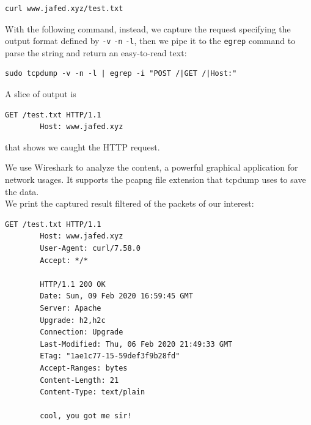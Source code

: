 \documentclass[12pt]{article}
\begin{document}
	\begin{lstlisting}[frame=single]
		curl www.jafed.xyz/test.txt
	\end{lstlisting}
	
	With the following command, instead, we capture the request specifying the output format defined by \lstinline{-v} \lstinline{-n} \lstinline{-l}, then we pipe it to the \lstinline{egrep} command to parse the string and return an easy-to-read text:\\
	
	\begin{lstlisting}[frame=single]
		sudo tcpdump -v -n -l | egrep -i "POST /|GET /|Host:"
	\end{lstlisting}

	A slice of output is\\
	
	\begin{lstlisting}[frame=single]
		GET /test.txt HTTP/1.1
        Host: www.jafed.xyz
	\end{lstlisting}

	that shows we caught the HTTP request.
	
	We use Wireshark to analyze the content, a powerful graphical application for network usages. It supports the pcapng file extension that tcpdump uses to save the data.\\
	We print the captured result filtered of the packets of our interest:\\
	
	\begin{lstlisting}[frame=single]
		GET /test.txt HTTP/1.1
		Host: www.jafed.xyz
		User-Agent: curl/7.58.0
		Accept: */*

		HTTP/1.1 200 OK
		Date: Sun, 09 Feb 2020 16:59:45 GMT
		Server: Apache
		Upgrade: h2,h2c
		Connection: Upgrade
		Last-Modified: Thu, 06 Feb 2020 21:49:33 GMT
		ETag: "1ae1c77-15-59def3f9b28fd"
		Accept-Ranges: bytes
		Content-Length: 21
		Content-Type: text/plain

		cool, you got me sir!
	\end{lstlisting}
\end{document}
